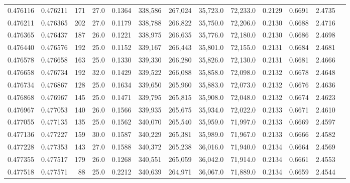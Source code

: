 \begin{tabular}{rrrrrrrrrrrrr}
0.476116 & 0.476211 &   171 & 27.0 &                                     0.1364 & 338,586 & 267,024 &  35,723.0 &  72,233.0 & 0.2129 & 0.6691 & 2.4735 \\
0.476211 & 0.476365 &   202 & 27.0 &                                     0.1179 & 338,788 & 266,822 &  35,750.0 &  72,206.0 & 0.2130 & 0.6688 & 2.4716 \\
0.476365 & 0.476437 &   187 & 26.0 &                                     0.1221 & 338,975 & 266,635 &  35,776.0 &  72,180.0 & 0.2130 & 0.6686 & 2.4698 \\
0.476440 & 0.476576 &   192 & 25.0 &                                     0.1152 & 339,167 & 266,443 &  35,801.0 &  72,155.0 & 0.2131 & 0.6684 & 2.4681 \\
0.476578 & 0.476658 &   163 & 25.0 &                                     0.1330 & 339,330 & 266,280 &  35,826.0 &  72,130.0 & 0.2131 & 0.6681 & 2.4666 \\
0.476658 & 0.476734 &   192 & 32.0 &                                     0.1429 & 339,522 & 266,088 &  35,858.0 &  72,098.0 & 0.2132 & 0.6678 & 2.4648 \\
0.476734 & 0.476867 &   128 & 25.0 &                                     0.1634 & 339,650 & 265,960 &  35,883.0 &  72,073.0 & 0.2132 & 0.6676 & 2.4636 \\
0.476868 & 0.476967 &   145 & 25.0 &                                     0.1471 & 339,795 & 265,815 &  35,908.0 &  72,048.0 & 0.2132 & 0.6674 & 2.4623 \\
0.476967 & 0.477053 &   140 & 26.0 &                                     0.1566 & 339,935 & 265,675 &  35,934.0 &  72,022.0 & 0.2133 & 0.6671 & 2.4610 \\
0.477055 & 0.477135 &   135 & 25.0 &                                     0.1562 & 340,070 & 265,540 &  35,959.0 &  71,997.0 & 0.2133 & 0.6669 & 2.4597 \\
0.477136 & 0.477227 &   159 & 30.0 &                                     0.1587 & 340,229 & 265,381 &  35,989.0 &  71,967.0 & 0.2133 & 0.6666 & 2.4582 \\
0.477228 & 0.477353 &   143 & 27.0 &                                     0.1588 & 340,372 & 265,238 &  36,016.0 &  71,940.0 & 0.2134 & 0.6664 & 2.4569 \\
0.477355 & 0.477517 &   179 & 26.0 &                                     0.1268 & 340,551 & 265,059 &  36,042.0 &  71,914.0 & 0.2134 & 0.6661 & 2.4553 \\
0.477518 & 0.477571 &    88 & 25.0 &                                     0.2212 & 340,639 & 264,971 &  36,067.0 &  71,889.0 & 0.2134 & 0.6659 & 2.4544 \\

\end{tabular}
